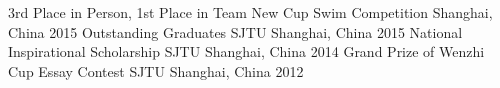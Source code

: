 \vspace{-10pt}
\begin{cvhonors}
  \cvhonor
    {3rd Place in Person, 1st Place in Team}
    {New Cup Swim Competition}
    {Shanghai, China}
    {2015}
    \cvhonor
    {Outstanding Graduates}
    {SJTU}
    {Shanghai, China}
    {2015}
  \cvhonor
    {National Inspirational Scholarship}
    {SJTU}
    {Shanghai, China}
    {2014}
    \cvhonor
    {Grand Prize of Wenzhi Cup Essay Contest}
    {SJTU}
    {Shanghai, China}
    {2012}
\end{cvhonors}
